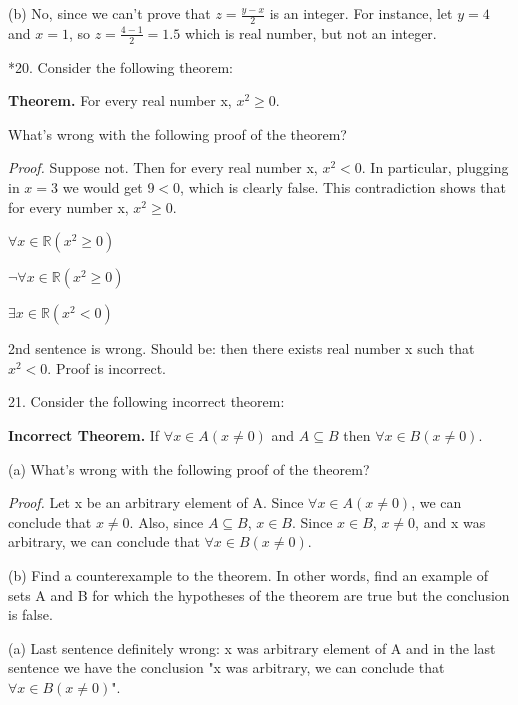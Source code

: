 \documentclass{article}
\begin{document}
\vspace{20pt}

(b) No, since we can't prove that $z = \frac{y - x}{2}$ is an integer.
For instance, let $y = 4$ and $x = 1$, so $z = \frac{4-1}{2} = 1.5$ which is real number, but not an integer.


\vspace{30pt}

*20. Consider the following theorem:

\textbf{Theorem.} For every real number x, $x^2 \geq 0$.

What's wrong with the following proof of the theorem?

\textit{Proof.} Suppose not. Then for every real number x, $x^2 < 0$. In particular,
plugging in $x = 3$ we would get $9 < 0$, which is clearly false. This
contradiction shows that for every number x, $x^2 \geq 0$.
\vspace{30pt}

$\forall x \in \mathbb{R} (x^2 \geq 0)$

$\neg \forall x \in \mathbb{R} (x^2 \geq 0)$

$\exists x \in \mathbb{R} (x^2 < 0)$

2nd sentence is wrong. Should be: then there exists real number x such that $x^2 < 0$. Proof is incorrect.

\vspace{30pt}

21. Consider the following incorrect theorem:

\textbf{Incorrect Theorem.} If $\forall x \in A(x \neq 0)$ and $A \subseteq B$ then $\forall x \in B(x
\neq 0)$.

\hspace{12pt}(a) What's wrong with the following proof of the theorem?

\textit{Proof.} Let x be an arbitrary element of A. Since $\forall x \in A(x \neq 0)$,
we can conclude that $x \neq 0$. Also, since $A \subseteq B$, $x \in B$. Since
$x \in B$, $x \neq 0$, and x was arbitrary, we can conclude that $\forall x \in
B(x \neq 0)$.

\hspace{12pt}(b) Find a counterexample to the theorem. In other words, find an example
of sets A and B for which the hypotheses of the theorem are
true but the conclusion is false.
\vspace{30pt}

(a) Last sentence definitely wrong: x was arbitrary element of A and in the last sentence we have the conclusion "x was arbitrary, we can conclude that $\forall x \in B(x \neq 0)$".
\end{document}

